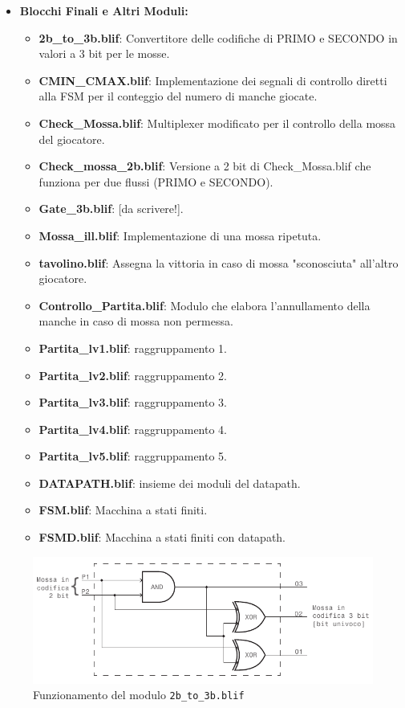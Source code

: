 \documentclass[a4paper]{report}
\begin{document}
  \begin{itemize}\small
    \item \textbf{Blocchi Finali e Altri Moduli:}
    \begin{itemize}
        \item \textbf{2b\_to\_3b.blif}: Convertitore delle codifiche di PRIMO e SECONDO in valori a 3 bit per le mosse.
        \item \textbf{CMIN\_CMAX.blif}: Implementazione dei segnali di controllo diretti alla FSM per il conteggio del numero di manche giocate.
        \item \textbf{Check\_Mossa.blif}: Multiplexer modificato per il controllo della mossa del giocatore.
        \item \textbf{Check\_mossa\_2b.blif}: Versione a 2 bit di Check\_Mossa.blif che funziona per due flussi (PRIMO e SECONDO).
        \item \textbf{Gate\_3b.blif}: [da scrivere!].
        \item \textbf{Mossa\_ill.blif}: Implementazione di una mossa ripetuta.
        \item \textbf{tavolino.blif}: Assegna la vittoria in caso di mossa "sconosciuta" all'altro giocatore.
        \item \textbf{Controllo\_Partita.blif}: Modulo che elabora l'annullamento della manche in caso di mossa non permessa.
        \item \textbf{Partita\_lv1.blif}: raggruppamento 1.
        \item \textbf{Partita\_lv2.blif}: raggruppamento 2.
        \item \textbf{Partita\_lv3.blif}: raggruppamento 3.
        \item \textbf{Partita\_lv4.blif}: raggruppamento 4.
        \item \textbf{Partita\_lv5.blif}: raggruppamento 5.
        \item \textbf{DATAPATH.blif}: insieme dei moduli del datapath.
        \item \textbf{FSM.blif}: Macchina a stati finiti.
        \item \textbf{FSMD.blif}: Macchina a stati finiti con datapath.
    \end{itemize}
\end{itemize}

\begin{figure}[h]
  \centering
  \includegraphics[scale=1]{3bmosse.pdf}
  \caption{Funzionamento del modulo \texttt{2b\_to\_3b.blif}}
  \label{img:3bmosse}
\end{figure}
\end{document}
